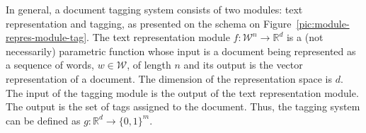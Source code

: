 \documentclass{article}
\renewcommand{\vec}[1]{\boldsymbol{#1}}
\newcommand{\bx}{\vec{x}}
\newcommand{\by}{\vec{y}}
\newcommand{\bw}{\vec{w}}
\newcommand{\calD}{\mathcal{D}}
\newcommand{\calW}{\mathcal{W}}
\newcommand\R{\mathbb{R}}   %
\newcommand{\bc}{\mathbf{c}}
\newcommand{\bd}{\mathbf{d}}
\begin{document}
In general, a document tagging system consists of two modules: text representation and tagging, as presented on the schema on Figure~\ref{pic:module-repres-module-tag}. The text representation module $f : \calW^{n} \rightarrow \R^{d}$ is a (not necessarily) parametric function whose input is a document being represented as a sequence of words, $w \in \calW$, of length $n$ and its output is the vector representation of a document. The dimension of the representation space is $d$. 
The input of the tagging module is the output of the text representation module. The output is the set of tags assigned to the document. Thus, the tagging system can be defined as $g: \R^{d} \rightarrow  \{ 0 , 1 \}^m$. 


%
%
%
%
\end{document}
